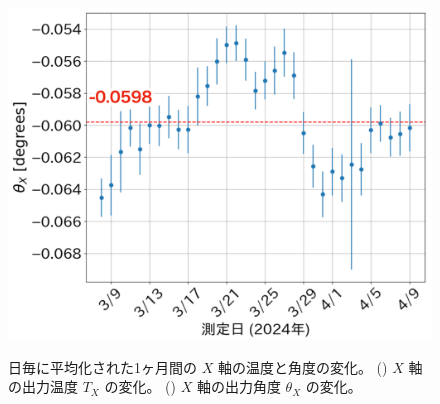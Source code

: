 \documentclass[../../main.tex]{subfiles}
\begin{document}
\begin{figure}[H]
\begin{minipage}[b]{0.527\columnwidth}
        \includegraphics[width=0.95\columnwidth]{tiltsensor/timedrift_angleX_daily.pdf}
        \subcaption{}
        \label{fig:timedrift_angleX}
    \end{minipage}
    \caption{日毎に平均化された1ヶ月間の $X$ 軸の温度と角度の変化。
             () $X$ 軸の出力温度 $T_{X}$ の変化。
             () $X$ 軸の出力角度 $\theta_{X}$ の変化。}
    \label{fig:timedrift_Xaxis}
\end{figure}
\end{document}
